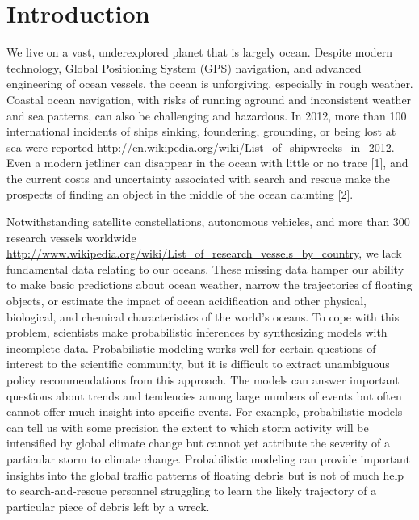 \section{Introduction}

We live on a vast, underexplored planet that is largely ocean. Despite modern technology, Global Positioning System (GPS) navigation, and advanced engineering of ocean vessels, the ocean is unforgiving, especially in rough weather. Coastal ocean navigation, with risks of running aground and inconsistent weather and sea patterns, can also be challenging and hazardous. In 2012, more than 100 international incidents of ships sinking, foundering, grounding, or being lost at sea were reported \url{http://en.wikipedia.org/wiki/List_of_shipwrecks_in_2012}. Even a modern jetliner can disappear in the ocean with little or no trace [1], and the current costs and uncertainty associated with search and rescue make the prospects of finding an object in the middle of the ocean daunting [2].

Notwithstanding satellite constellations, autonomous vehicles, and more than 300 research vessels worldwide \url{http://www.wikipedia.org/wiki/List_of_research_vessels_by_country}, we lack fundamental data relating to our oceans. These missing data hamper our ability to make basic predictions about ocean weather, narrow the trajectories of floating objects, or estimate the impact of ocean acidification and other physical, biological, and chemical characteristics of the world's oceans. To cope with this problem, scientists make probabilistic inferences by synthesizing models with incomplete data. Probabilistic modeling works well for certain questions of interest to the scientific community, but it is difficult to extract unambiguous policy recommendations from this approach. The models can answer important questions about trends and tendencies among large numbers of events but often cannot offer much insight into specific events. For example, probabilistic models can tell us with some precision the extent to which storm activity will be intensified by global climate change but cannot yet attribute the severity of a particular storm to climate change. Probabilistic modeling can provide important insights into the global traffic patterns of floating debris but is not of much help to search-and-rescue personnel struggling to learn the likely trajectory of a particular piece of debris left by a wreck.


